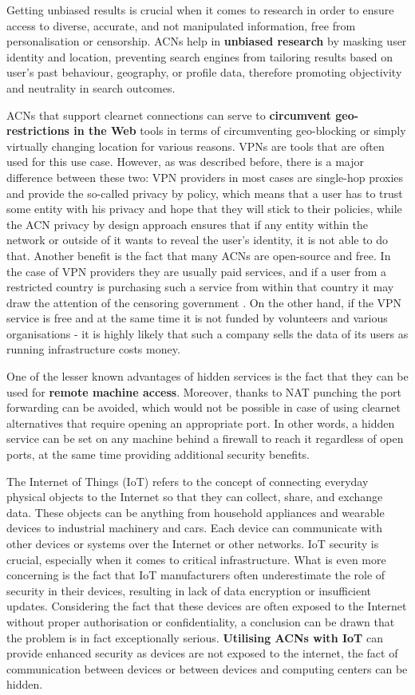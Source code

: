 Getting unbiased results is crucial when it comes to research in order to ensure access to diverse, accurate, and not manipulated information, free from personalisation or censorship. ACNs help in \textbf{unbiased research} by masking user identity and location, preventing search engines from tailoring results based on user’s past behaviour, geography, or profile data, therefore promoting objectivity and neutrality in search outcomes.

ACNs that support clearnet connections can serve to \textbf{circumvent geo-restrictions in the Web} tools in terms of circumventing geo-blocking or simply virtually changing location for various reasons. VPNs are tools that are often used for this use case. However, as was described before, there is a major difference between these two: VPN providers in most cases are single-hop proxies and provide the so-called privacy by policy, which means that a user has to trust some entity with his privacy and hope that they will stick to their policies, while the ACN privacy by design approach ensures that if any entity within the network or outside of it wants to reveal the user’s identity, it is not able to do that.
Another benefit is the fact that many ACNs are open-source and free. In the case of VPN providers they are usually paid services, and if a user from a restricted country is purchasing such a service from within that country it may draw the attention of the censoring government \cite{russia}. On the other hand, if the VPN service is free and at the same time it is not funded by volunteers and various organisations - it is highly likely that such a company sells the data of its users as running infrastructure costs money.

One of the lesser known advantages of hidden services is the fact that they can be used for \textbf{remote machine access}. Moreover, thanks to NAT punching the port forwarding can be avoided, which would not be possible in case of using clearnet alternatives that require opening an appropriate port. In other words, a hidden service can be set on any machine behind a firewall to reach it regardless of open ports, at the same time providing additional security benefits.

The Internet of Things (IoT) refers to the concept of connecting everyday physical objects to the Internet so that they can collect, share, and exchange data. These objects can be anything from household appliances and wearable devices to industrial machinery and cars. Each device can communicate with other devices or systems over the Internet or other networks. IoT security is crucial, especially when it comes to critical infrastructure. What is even more concerning is the fact that IoT manufacturers often underestimate the role of security in their devices, resulting in lack of data encryption or insufficient updates. Considering the fact that these devices are often exposed to the Internet without proper authorisation or confidentiality, a conclusion can be drawn that the problem is in fact exceptionally serious.
\textbf{Utilising ACNs with IoT} can provide enhanced security as devices are not exposed to the internet, the fact of communication between devices or between devices and computing centers can be hidden.

